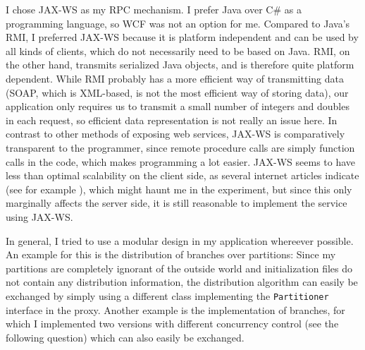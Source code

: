 \documentclass[12pt,a4paper,fleqn]{article}
\begin{document}
I chose JAX-WS as my RPC mechanism. I prefer Java over C\# as a programming language, so WCF was not an option for me. Compared to Java's RMI, I preferred JAX-WS because it is platform independent and can be used by all kinds of clients, which do not necessarily need to be based on Java. RMI, on the other hand, transmits serialized Java objects, and is therefore quite platform dependent. While RMI probably has a more efficient way of transmitting data (SOAP, which is XML-based, is not the most efficient way of storing data), our application only requires us to transmit a small number of integers and doubles in each request, so efficient data representation is not really an issue here. In contrast to other methods of exposing web services, JAX-WS is comparatively transparent to the programmer, since remote procedure calls are simply function calls in the code, which makes programming a lot easier. JAX-WS seems to have less than optimal scalability on the client side, as several internet articles indicate (see for example \cite{Pollmeier2011}), which might haunt me in the experiment, but since this only marginally affects the server side, it is still reasonable to implement the service using JAX-WS.

In general, I tried to use a modular design in my application whereever possible. An example for this is the distribution of branches over partitions: Since my partitions are completely ignorant of the outside world and initialization files do not contain any distribution information, the distribution algorithm can easily be exchanged by simply using a different class implementing the \texttt{Partitioner} interface in the proxy. Another example is the implementation of branches, for which I implemented two versions with different concurrency control (see the following question) which can also easily be exchanged.
\end{document}
